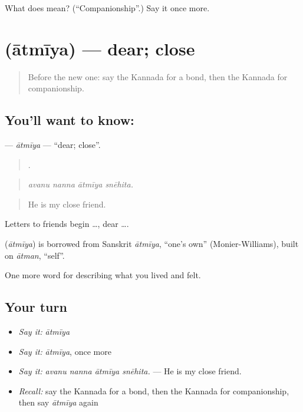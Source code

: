 \begin{tcolorbox}[breakable,colback=teal!4,colframe=teal!35!black,title={Before you move on}]
What does  mean? (\textquotedblleft{}Companionship\textquotedblright{}.) Say it once more.
\end{tcolorbox}
\section[\texorpdfstring{\kn{ಆತ್ಮೀಯ} (ātmīya)}{ಆತ್ಮೀಯ (ātmīya)}]{ (ātmīya) — dear; close}

\label{lesson:KA-C528-atmiya}



\begin{quote}
Before the new one: say the Kannada for a bond, then the Kannada for companionship.
\end{quote}

\subsection*{You'll want to know: }
\textbf{} — \emph{ātmīya} — \textquotedblleft{}dear; close\textquotedblright{}.

\begin{quote}
   .
\end{quote}

\begin{quote}
\emph{avanu nanna ātmīya snēhita.}
\end{quote}

\begin{quote}
He is my close friend.
\end{quote}

Letters to friends begin  …, dear ….

\begin{cousinweb}
\textbf{} (\emph{ātmīya}) is borrowed from Sanskrit \emph{ātmīya}, \textquotedblleft{}one's own\textquotedblright{} (Monier-Williams), built on \emph{ātman}, \textquotedblleft{}self\textquotedblright{}.
\end{cousinweb}

\begin{grammarlens}[title={What you've built}]
One more word for describing what you lived and felt.
\end{grammarlens}

\subsection*{Your turn}
\begin{itemize}
\raggedright
  \item \emph{Say it:} \emph{ātmīya}
  \item \emph{Say it:} \emph{ātmīya}, once more
  \item \emph{Say it:} \emph{avanu nanna ātmīya snēhita.} — He is my close friend.
  \item \emph{Recall:} say the Kannada for a bond, then the Kannada for companionship, then say \emph{ātmīya} again
\end{itemize}

